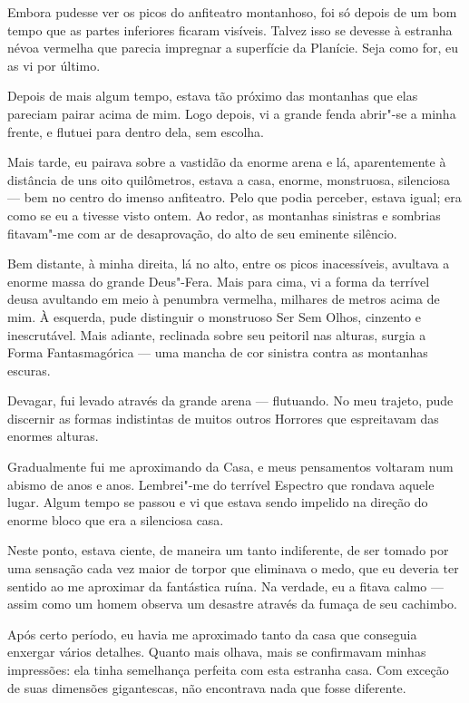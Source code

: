 Embora pudesse ver os picos do anfiteatro montanhoso, foi só depois de um bom tempo que as partes inferiores ficaram
visíveis. Talvez isso se devesse à estranha névoa vermelha que parecia impregnar a superfície da Planície. Seja como
for, eu as vi por último.

Depois de mais algum tempo, estava tão próximo das montanhas que elas pareciam pairar acima de mim. Logo
depois, vi a grande fenda abrir"-se a minha frente, e flutuei para dentro dela, sem escolha.

Mais tarde, eu pairava sobre a vastidão da enorme arena e lá, aparentemente à distância de uns oito quilômetros,
estava a casa, enorme, monstruosa, silenciosa --- bem no centro do imenso anfiteatro. Pelo que podia perceber, estava
igual; era como se eu a tivesse visto ontem. Ao redor, as montanhas sinistras e sombrias fitavam"-me com ar
de desaprovação, do alto de seu eminente silêncio.

Bem distante, à minha direita, lá no alto, entre os picos inacessíveis, avultava a enorme massa do grande Deus"-Fera.
Mais para cima, vi a forma da terrível deusa avultando em meio à penumbra vermelha, milhares de metros acima de mim.
À esquerda, pude distinguir o monstruoso Ser Sem Olhos, cinzento e inescrutável. Mais adiante, reclinada sobre seu
peitoril nas alturas, surgia a Forma Fantasmagórica --- uma mancha de cor sinistra contra as montanhas escuras.

Devagar, fui levado através da grande arena --- flutuando. No meu trajeto, pude discernir as formas indistintas de
muitos outros Horrores que espreitavam das enormes alturas.

Gradualmente fui me aproximando da Casa, e meus pensamentos voltaram num abismo de anos e anos. Lembrei"-me do terrível
Espectro que rondava aquele lugar. Algum tempo se passou e vi que estava sendo impelido na direção do enorme bloco que
era a silenciosa casa.

Neste ponto, estava ciente, de maneira um tanto indiferente, de ser tomado por uma sensação cada vez maior de torpor
que eliminava o medo, que eu deveria ter sentido ao me aproximar da fantástica ruína. Na verdade, eu a fitava
calmo --- assim como um homem observa um desastre através da fumaça de seu cachimbo.

Após certo período, eu havia me aproximado tanto da casa que conseguia enxergar vários detalhes. Quanto mais olhava,
mais se confirmavam minhas impressões: ela tinha semelhança perfeita com esta estranha casa. Com exceção de suas
dimensões gigantescas, não encontrava nada que fosse diferente.

